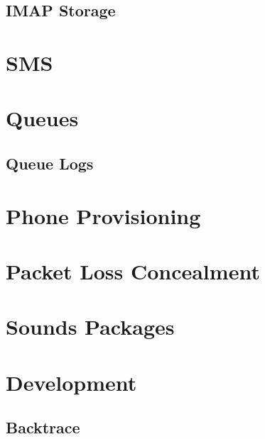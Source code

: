 \documentclass[12pt,a4]{report}
\begin{document}
  \section{IMAP Storage}
  

\chapter{SMS}


\chapter{Queues}
  
  \section{Queue Logs}
  

\chapter{Phone Provisioning}
  

\chapter{Packet Loss Concealment}
  

\chapter{Sounds Packages}
  

\chapter{Development}
  \section{Backtrace}
  



%
%
\end{document}

